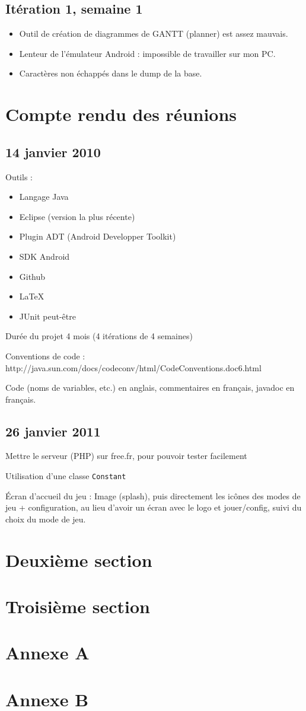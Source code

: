 \documentclass[a4paper,11pt,french]{article}
\begin{document}
\subsection{Itération 1, semaine 1}
\begin{itemize}
\item Outil de création de diagrammes de GANTT (planner) est assez mauvais.
\item Lenteur de l'émulateur Android : impossible de travailler sur mon PC.%
\item Caractères non échappés dans le dump de la base.%
\end{itemize}

\section{Compte rendu des réunions}
\subsection{14 janvier 2010}
Outils :
\begin{itemize}
\item Langage Java
\item Eclipse (version la plus récente)
\item Plugin ADT (Android Developper Toolkit)
\item SDK Android
\item Github
\item LaTeX
\item JUnit peut-être
\end{itemize}

Durée du projet 4 mois (4 itérations de 4 semaines)

Conventions de code : http://java.sun.com/docs/codeconv/html/CodeConventions.doc6.html

Code (noms de variables, etc.) en anglais, commentaires en français, javadoc en français.

\subsection{26 janvier 2011}
Mettre le serveur (PHP) sur free.fr, pour pouvoir tester facilement

Utilisation d'une classe \verb!Constant!

Écran d'accueil du jeu : Image (splash), puis directement les icônes des modes de jeu + configuration, au lieu d'avoir un écran avec le logo et jouer/config, suivi du choix du mode de jeu.

\section{Deuxième section}
\section{Troisième section}
\newpage
\appendix
\section{Annexe A}
\section{Annexe B}
\end{document}
